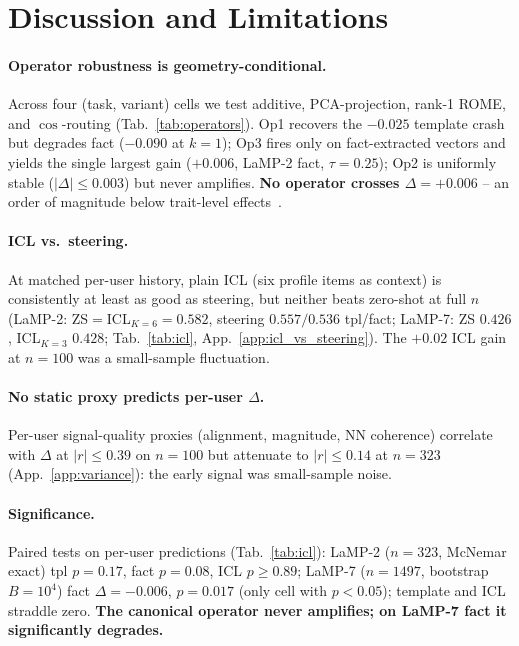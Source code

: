 \documentclass{article}
\begin{document}
\section{Discussion and Limitations}
\label{sec:discussion}

\paragraph{Operator robustness is geometry-conditional.}  Across
four (task, variant) cells we test additive, PCA-projection,
rank-1 ROME, and $\cos$-routing (Tab.~\ref{tab:operators}).  Op1
recovers the $-0.025$ template crash but degrades fact ($-0.090$
at $k{=}1$); Op3 fires only on fact-extracted vectors and yields
the single largest gain ($+0.006$, LaMP-2 fact, $\tau{=}0.25$);
Op2 is uniformly stable ($|\Delta|\!\le\!0.003$) but never
amplifies.  \textbf{No operator crosses $\Delta{=}+0.006$} -- an
order of magnitude below trait-level
effects~\cite{chen2025persona,rimsky2024caa}.

\paragraph{ICL vs.\ steering.}  At matched per-user history, plain
ICL (six profile items as context) is consistently at least as
good as steering, but neither beats zero-shot at full $n$ (LaMP-2:
ZS${=}$ICL$_{K{=}6}{=}0.582$, steering $0.557/0.536$ tpl/fact;
LaMP-7: ZS $0.426$, ICL$_{K{=}3}$ $0.428$;
Tab.~\ref{tab:icl}, App.~\ref{app:icl_vs_steering}).  The $+0.02$
ICL gain at $n{=}100$ was a small-sample fluctuation.

\paragraph{No static proxy predicts per-user $\Delta$.}  Per-user
signal-quality proxies (alignment, magnitude, NN coherence)
correlate with $\Delta$ at $|r|\!\le\!0.39$ on $n{=}100$ but
attenuate to $|r|\!\le\!0.14$ at $n{=}323$
(App.~\ref{app:variance}): the early signal was small-sample noise.

\paragraph{Significance.}  Paired tests on per-user predictions
(Tab.~\ref{tab:icl}): LaMP-2 ($n{=}323$, McNemar exact) tpl
$p{=}0.17$, fact $p{=}0.08$, ICL $p\!\ge\!0.89$; LaMP-7 ($n{=}1497$,
bootstrap $B{=}10^4$) fact $\Delta{=}{-}0.006$, $p{=}0.017$ (only
cell with $p\!<\!0.05$); template and ICL straddle zero.
\textbf{The canonical operator never amplifies; on LaMP-7 fact it
significantly degrades.}
\end{document}
